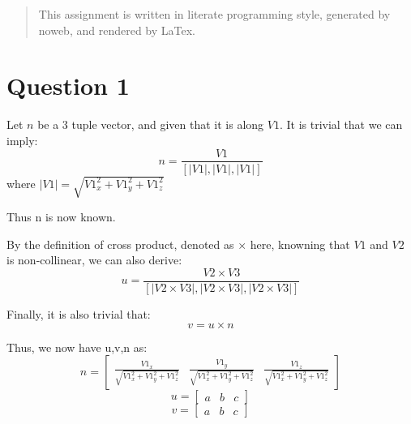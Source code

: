 \documentclass[12pt]{article}
\begin{document}
\maketitle

\begin{abstract}
  This assignment is written in literate programming style, generated by noweb, and rendered by LaTex.
\end{abstract}

\section{Question 1}
Let $n$ be a 3 tuple vector, and given that it is along $V1$. It is trivial that  we can imply:
\[
        n = \frac{V1}{[|V1|,|V1|,|V1|]}
\]
where $|V1| = \sqrt{V1_x^2+V1_y^2+V1_z^2}$

Thus n is now known.

By the definition of cross product, denoted as $\times$ here, knowning that $V1$ and $V2$ is non-collinear, we can also derive:
\[
        u = \frac{V2 \times V3}{[|V2 \times V3|,|V2 \times V3|,|V2 \times V3|]}
\]

Finally, it is also trivial that:
\[
        v = u \times n
\]

Thus, we now have u,v,n as:
\[
        n = \begin{bmatrix}
            \frac{V1_x}{\sqrt{V1_x^2+V1_y^2+V1_z^2}}
            &
            \frac{V1_y}{\sqrt{V1_x^2+V1_y^2+V1_z^2}}
            &
            \frac{V1_z}{\sqrt{V1_x^2+V1_y^2+V1_z^2}}
            \end{bmatrix}
\]
\[
        u = \begin{bmatrix}
            a
            &
            b
            &
            c 
            \end{bmatrix}
\]
\[
        v = \begin{bmatrix}
            a & b & c 
            \end{bmatrix}
\]
\end{document}
